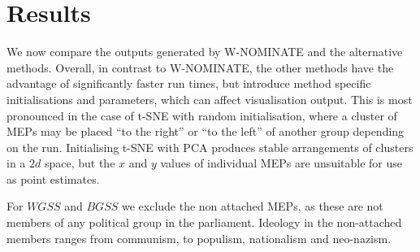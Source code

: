 \documentclass{llncs}
\begin{document}
%
%
%
\section{Results}
\label{sec:results}
We now compare the outputs generated by  W-NOMINATE and the alternative methods. Overall, in contrast to W-NOMINATE, the other methods have the advantage of significantly faster run times, but introduce method specific initialisations and parameters, which can affect visualisation output. This is most pronounced in the case of t-SNE with random initialisation, where a cluster of MEPs may be placed ``to the right'' or ``to the left'' of another group depending on the run. Initialising t-SNE with PCA produces stable arrangements of clusters in a $2d$ space, but the $x$ and $y$ values of individual MEPs are unsuitable for use as point estimates.

For $WGSS$ and $BGSS$ we exclude the non attached MEPs, as these are not members of any political group in the parliament. Ideology in the non-attached members ranges from communism, to populism, nationalism and neo-nazism.
\end{document}
